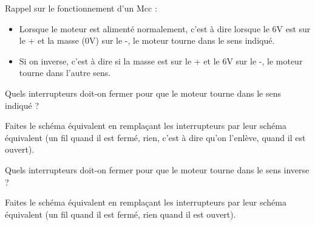 \documentclass[10pt,fleqn]{article} %
\begin{document}
  Rappel sur le fonctionnement d’un Mcc :
\begin{itemize}
  \item Lorsque le moteur est alimenté normalement, c’est à dire lorsque le 6V est sur le + et la masse (0V) sur le -, le moteur tourne dans le sens indiqué.
  \item Si on inverse, c’est à dire si la masse est sur le + et le 6V sur le -, le moteur tourne dans l’autre sens.
\end{itemize}
\begin{question}
  Quels interrupteurs doit-on fermer pour que le moteur tourne dans le sens indiqué ?
\end{question}
\begin{question}
  Faites le schéma équivalent en remplaçant les interrupteurs par leur schéma équivalent (un fil quand il est fermé, rien, c’est à dire qu’on l’enlève, quand il est ouvert).
\end{question}
\pagebreak
\begin{question}
Quels interrupteurs doit-on fermer pour que le moteur tourne dans le sens inverse ?
\end{question}
\begin{question}
   Faites le schéma équivalent en remplaçant les interrupteurs par leur schéma équivalent (un fil quand il est fermé, rien quand il est ouvert).
\end{question}
\end{document}
